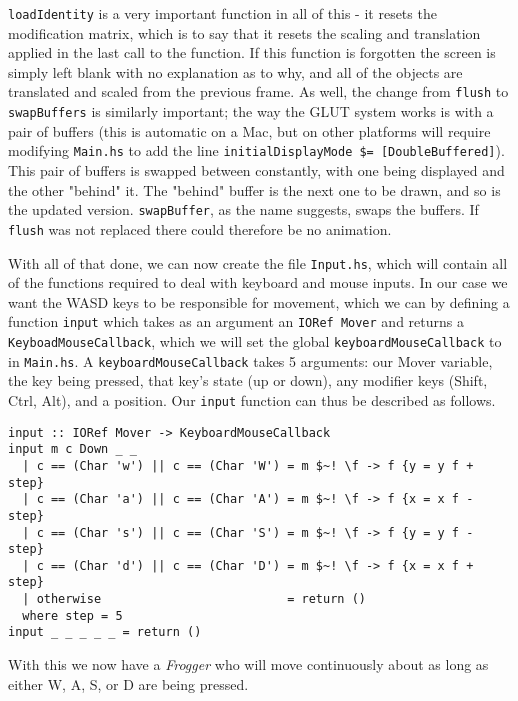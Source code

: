 \documentclass[12pt, a4paper]{report}
\begin{document}
\verb|loadIdentity| is a very important function in all of this - it resets the modification matrix, which is to say that it resets the scaling and translation applied in the last call to the function.
If this function is forgotten the screen is simply left blank with no explanation as to why, and all of the objects are translated and scaled from the previous frame.
As well, the change from \verb|flush| to \verb|swapBuffers| is similarly important; the way the GLUT system works is with a pair of buffers (this is automatic on a Mac, but on other platforms will require modifying \verb|Main.hs| to add the line \verb|initialDisplayMode $= [DoubleBuffered]|).
This pair of buffers is swapped between constantly, with one being displayed and the other "behind" it.
The "behind" buffer is the next one to be drawn, and so is the updated version.
\verb|swapBuffer|, as the name suggests, swaps the buffers.
If \verb|flush| was not replaced there could therefore be no animation.

\par

With all of that done, we can now create the file \verb|Input.hs|, which will contain all of the functions required to deal with keyboard and mouse inputs.
In our case we want the WASD keys to be responsible for movement, which we can by defining a function \verb|input| which takes as an argument an \verb|IORef Mover| and returns a \verb|KeyboadMouseCallback|, which we will set the global \verb|keyboardMouseCallback| to in \verb|Main.hs|.
A \verb|keyboardMouseCallback| takes 5 arguments: our Mover variable, the key being pressed, that key's state (up or down), any modifier keys (Shift, Ctrl, Alt), and a position.
Our \verb|input| function can thus be described as follows.

\begin{lstlisting}[xleftmargin=-0.1\textwidth, xrightmargin=-0.1\textwidth]
input :: IORef Mover -> KeyboardMouseCallback
input m c Down _ _
  | c == (Char 'w') || c == (Char 'W') = m $~! \f -> f {y = y f + step}
  | c == (Char 'a') || c == (Char 'A') = m $~! \f -> f {x = x f - step}
  | c == (Char 's') || c == (Char 'S') = m $~! \f -> f {y = y f - step}
  | c == (Char 'd') || c == (Char 'D') = m $~! \f -> f {x = x f + step}
  | otherwise                          = return ()
  where step = 5
input _ _ _ _ _ = return ()
\end{lstlisting}

With this we now have a \textit{Frogger} who will move continuously about as long as either W, A, S, or D are being pressed.
\end{document}
